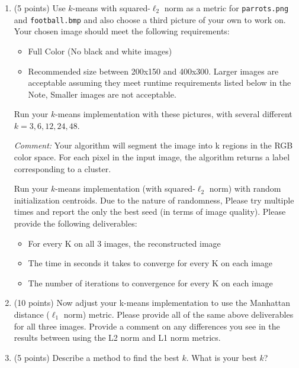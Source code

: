 \documentclass[twoside,10pt]{article}
\begin{document}
\begin{enumerate}
 
\item  (5 points) Use $k$-means with squared-$\ell_2$ norm as a metric for \texttt{parrots.png} and \texttt{football.bmp} and also choose a third picture of your own to work on. Your chosen image should meet the following requirements: 
\begin{itemize}
    \item Full Color (No black and white images)
    \item Recommended size between 200x150 and 400x300. Larger images are acceptable assuming they meet runtime requirements listed below in the Note, Smaller images are not acceptable.
\end{itemize}
Run your $k$-means implementation with these pictures, with several different $k = 3, 6, 12, 24, 48$.
  
{\it Comment:}  Your algorithm will segment the image into k regions in the RGB color space. For each pixel in the input image, the algorithm returns a label corresponding to a cluster.
  
Run your $k$-means implementation (with squared-$\ell_2$ norm) with random initialization centroids. Due to the nature of randomness, Please try multiple times and report the only the best seed (in terms of image quality). Please provide the following deliverables:
\begin{itemize}
    \item For every K on all 3 images, the reconstructed image
    \item The time in seconds it takes to converge for every K on each image
    \item The number of iterations to convergence for every K on each image
\end{itemize}
  
\item (10 points) Now adjust your k-means implementation to use the Manhattan distance ($\ell_1$ norm) metric. Please provide all of the same above deliverables for all three images. Provide a comment on any differences you see in the results between using the L2 norm and L1 norm metrics.

\item (5 points) Describe a method to find the best $k$. What is your best $k$?

\end{enumerate}
  
\end{document}
